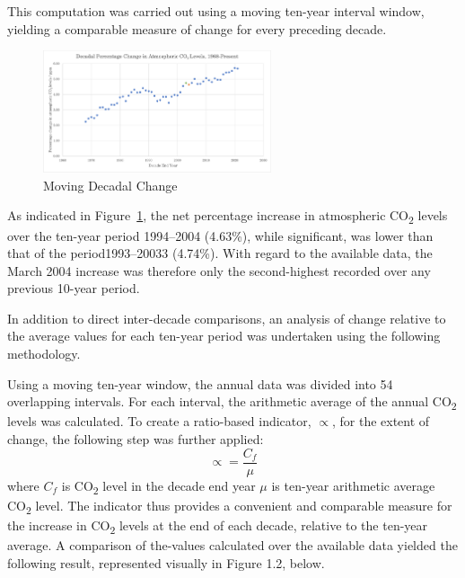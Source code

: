 \documentclass[12pt]{mcmthesis}
\newcommand{\size}[2]{{\fontsize{#1}{0}\selectfont#2}}
\begin{document}
    This computation was carried out using a moving ten-year interval window, yielding a comparable measure of change for every preceding decade.

    \begin{figure}
        \centering
        \includegraphics[width=0.6\textwidth]{1a_10y_chg_rel}
        \caption{Moving Decadal Change}
        \label{fig:1a_1}
    \end{figure}

    As indicated in Figure~\ref{fig:1a_1}, the net percentage increase in atmospheric CO\textsubscript{2} levels over the ten-year period 1994--2004 (4.63\%), while significant, was lower than that of the period1993--20033 (4.74\%). With regard to the available data, the March 2004 increase was therefore only the second-highest recorded over any previous 10-year period.

    \noindent\size{12}{\textbf{Comparing to moving averages}}

    In addition to direct inter-decade comparisons, an analysis of change relative to the average values for each ten-year period was undertaken using the following methodology.

    Using a moving ten-year window, the annual data was divided into 54 overlapping intervals.
    For each interval, the arithmetic average of the annual CO\textsubscript{2} levels was calculated.
    To create a ratio-based indicator, $\propto$, for the extent of change, the following step was further applied:
%
    \begin{equation}
        \propto = \frac{C_f}{\mu}
    \end{equation}
%
    where
    $C_f$ is CO\textsubscript{2} level in the decade end year
    $\mu$ is ten-year arithmetic average CO\textsubscript{2} level.
    The indicator thus provides a convenient and comparable measure for the increase in CO\textsubscript{2} levels at the end of each decade, relative to the ten-year average. A comparison of the-values calculated over the available data yielded the following result, represented visually in Figure 1.2, below.
\end{document}
